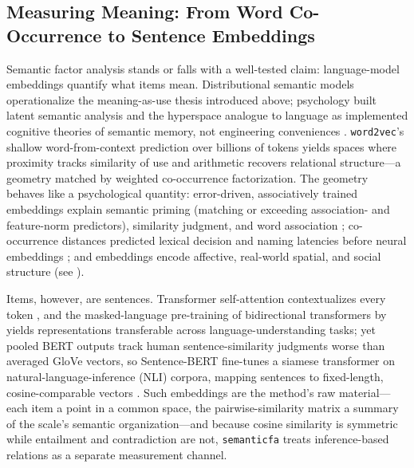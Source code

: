 \subsection{Measuring Meaning: From Word Co-Occurrence to Sentence Embeddings}

Semantic factor analysis stands or falls with a well-tested claim: language-model embeddings quantify what items mean. Distributional semantic models operationalize the meaning-as-use thesis introduced above; psychology built latent semantic analysis and the hyperspace analogue to language as implemented cognitive theories of semantic memory, not engineering conveniences \citep{gunther-etal-2019}. \texttt{word2vec}'s shallow word-from-context prediction over billions of tokens \citep{mikolov-etal-2013} yields spaces where proximity tracks similarity of use and arithmetic recovers relational structure---a geometry \citet{pennington-etal-2014} matched by weighted co-occurrence factorization. The geometry behaves like a psychological quantity: error-driven, associatively trained embeddings explain semantic priming (matching or exceeding association- and feature-norm predictors), similarity judgment, and word association \citep{mandera-etal-2017}; co-occurrence distances predicted lexical decision and naming latencies before neural embeddings \citep{buchanan-etal-2001}; and embeddings encode affective, real-world spatial, and social structure (see \citealp{gunther-etal-2019}).

Items, however, are sentences. Transformer self-attention contextualizes every token \citep{vaswani-etal-2017}, and the masked-language pre-training of bidirectional transformers by \citet{devlin-etal-2019} yields representations transferable across language-understanding tasks; yet pooled BERT outputs track human sentence-similarity judgments worse than averaged GloVe vectors, so Sentence-BERT fine-tunes a siamese transformer on natural-language-inference (NLI) corpora, mapping sentences to fixed-length, cosine-comparable vectors \citep{reimers-gurevych-2019}. Such embeddings are the method's raw material---each item a point in a common space, the pairwise-similarity matrix a summary of the scale's semantic organization---and because cosine similarity is symmetric while entailment and contradiction are not, \texttt{semanticfa} treats inference-based relations as a separate measurement channel.

